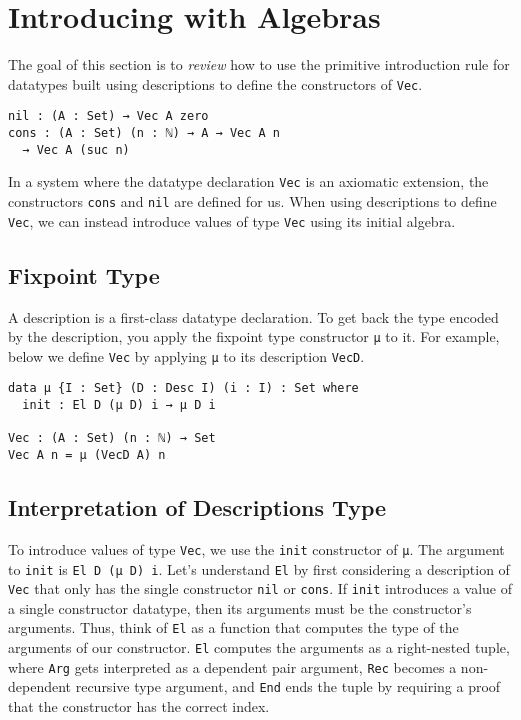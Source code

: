 \documentclass[preprint,nonatbib]{sigplanconf}
\begin{document}
\section{Introducing with Algebras}
\label{sec:init}

The goal of this section is to {\it review} how to use the primitive
introduction rule for datatypes built using descriptions to define the
constructors of {\tt Vec}.

\begin{verbatim}
nil : (A : Set) → Vec A zero
cons : (A : Set) (n : ℕ) → A → Vec A n
  → Vec A (suc n)
\end{verbatim}

In a system where the datatype declaration {\tt Vec} is an axiomatic
extension, the constructors {\tt cons} and {\tt nil} are defined for
us. When using descriptions to define {\tt Vec}, we can instead
introduce values of type {\tt Vec} using its initial algebra.

\subsection{Fixpoint Type}

A description is a first-class datatype declaration. To get back the
type encoded by the description, you apply the fixpoint type
constructor {\tt μ} to it. For example, below we define {\tt Vec} by
applying {\tt μ} to its description {\tt VecD}.

\begin{verbatim}
data μ {I : Set} (D : Desc I) (i : I) : Set where
  init : El D (μ D) i → μ D i

Vec : (A : Set) (n : ℕ) → Set
Vec A n = μ (VecD A) n
\end{verbatim}

\subsection{Interpretation of Descriptions Type}
\label{sec:init:el}

To introduce values of type {\tt Vec}, we use the
{\tt init} constructor of {\tt μ}. The argument to {\tt init} is
{\tt El D (μ D) i}. Let's understand {\tt El} by first considering a
description of {\tt Vec} that only has the single constructor
{\tt nil} or {\tt cons}. If {\tt init} introduces
a value of a single constructor datatype, then its arguments must be
the constructor's arguments. Thus, think of
{\tt El} as a function that computes the type of the arguments of our
constructor. {\tt El} computes the arguments as a right-nested tuple,
where {\tt Arg} gets interpreted as a dependent pair argument,
{\tt Rec} becomes a non-dependent recursive type argument, and
{\tt End} ends the tuple by requiring a proof that the constructor has
the correct index.
\end{document}

